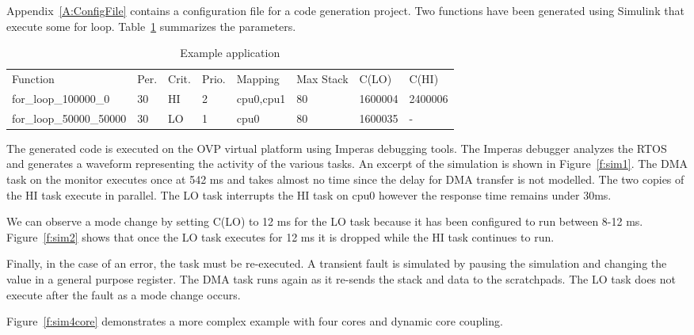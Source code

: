 	Appendix~\ref{A:ConfigFile} contains a configuration file for a code generation project. 
	Two functions have been generated using Simulink that execute some for loop. Table~\ref{t:config} summarizes the parameters.
	
	
	

\begin{table}[h]
\caption{Example application}
\centering

	\begin{tabular}{@{}llllllll@{}}
	\toprule
	Function & Per. & Crit. & Prio. & Mapping & Max Stack & C(LO) & C(HI) 	 \\
	for\_loop\_100000\_0 & 30 & HI & 2 & cpu0,cpu1 & 80 & 1600004 & 2400006 \\
	for\_loop\_50000\_50000 & 30 & LO & 1 & cpu0 & 80 & 1600035 & - \\
	\end{tabular}

\label{t:config}
\end{table}
	

	The generated code is executed on the OVP virtual platform using Imperas debugging tools. The Imperas debugger analyzes the RTOS and generates a waveform representing the activity of the various tasks. 
	An excerpt of the simulation is shown in Figure~\ref{f:sim1}.
	The DMA task on the monitor executes once at 542 ms and takes almost no time since the delay for DMA transfer is not modelled.
	The two copies of the HI task execute in parallel. The LO task interrupts the HI task on cpu0 however the response time remains under 30ms.
	
	We can observe a mode change by setting C(LO) to 12 ms for the LO task because it has been configured to run between 8-12 ms. 
	Figure~\ref{f:sim2} shows that once the LO task executes for 12 ms it is dropped while the HI task continues to run.
	 
		
	Finally, in the case of an error, the task must be re-executed. 
	A transient fault is simulated by pausing the simulation and changing the value in a general purpose register. 
	The DMA task runs again as it re-sends the stack and data to the scratchpads.
	The LO task does not execute after the fault as a mode change occurs.
	
		 


Figure~\ref{f:sim4core} demonstrates a more complex example with four cores and dynamic core coupling.

